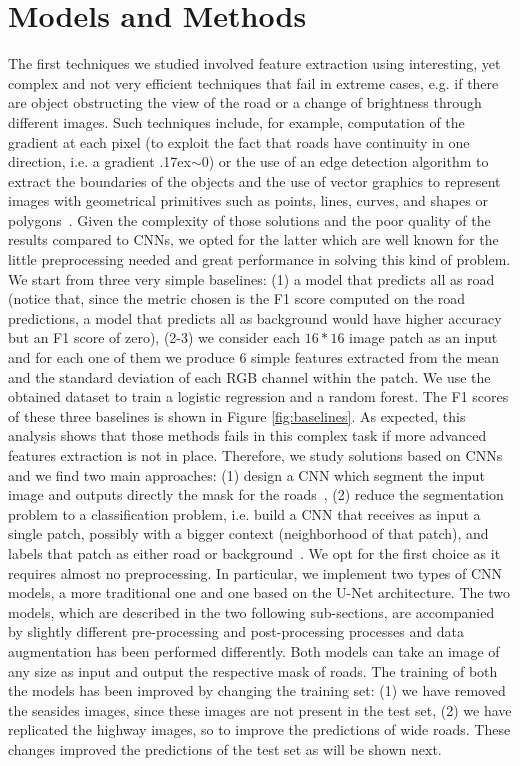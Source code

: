 \documentclass[10pt,conference,compsocconf]{IEEEtran}
\begin{document}
\section{Models and Methods}
\label{sec:models-methods}
The first techniques we studied involved feature extraction using interesting, yet complex and not very efficient techniques that fail in extreme cases, e.g. if there are object obstructing the view of the road or a change of brightness through different images. Such techniques include, for example, computation of the gradient at each pixel (to exploit the fact that roads have continuity in one direction, i.e. a gradient {\raise.17ex\hbox{$\scriptstyle\sim$}}0) or the use of an edge detection algorithm to extract the boundaries of the objects and the use of vector graphics to represent images with geometrical primitives such as points, lines, curves, and shapes or polygons~\cite{HORMESE20161460}. Given the complexity of those solutions and the poor quality of the results compared to CNNs, we opted for the latter which are well known for the little preprocessing needed and great performance in solving this kind of problem.
We start from three very simple baselines: (1) a model that predicts all as road (notice that, since the metric chosen is the F1 score computed on the road predictions, a model that predicts all as background would have higher accuracy but an F1 score of zero), (2-3) we consider each $16*16$ image patch as an input and for each one of them we produce 6 simple features extracted from the mean and the standard deviation of each RGB channel within the patch. We use the obtained dataset to train a logistic regression and a random forest. The F1 scores of these three baselines is shown in Figure \ref{fig:baselines}. As expected, this analysis shows that those methods fails in this complex task if more advanced features extraction is not in place.
Therefore, we study solutions based on CNNs and we find two main approaches: (1) design a CNN which segment the input image and outputs directly the mask for the roads~\cite{lis2016}, (2) reduce the segmentation problem to a classification problem, i.e. build a CNN that receives as input a single patch, possibly with a bigger context (neighborhood of that patch), and labels that patch as either road or background~\cite{dario2016}. We opt for the first choice as it requires almost no preprocessing. In particular, we implement two types of CNN models, a more traditional one and one based on the U-Net architecture. The two models, which are described in the two following sub-sections, are accompanied by slightly different pre-processing and post-processing processes and data augmentation has been performed differently. Both models can take an image of any size as input and output the respective mask of roads. The training of both the models has been improved by changing the training set: (1) we have removed the seasides images, since these images are not present in the test set, (2) we have replicated the highway images, so to improve the predictions of wide roads. These changes improved the predictions of the test set as will be shown next.
\end{document}
